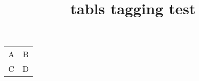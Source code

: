 \documentclass{article}
\title{tabls tagging test}
\begin{document}
\begin{tabular}{cc}
A & B \\
C & D \\
\end{tabular} 
\end{document}
